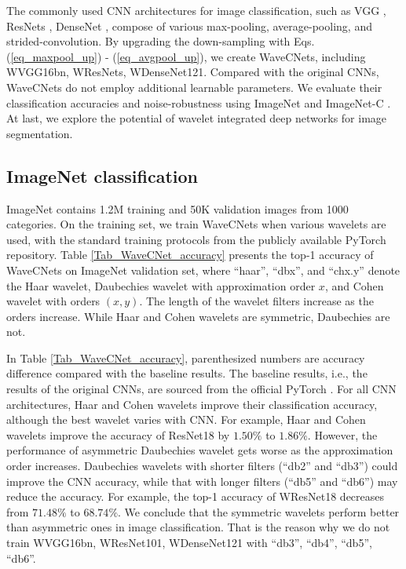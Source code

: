 \documentclass[10pt,twocolumn,letterpaper]{article}
\begin{document}
The commonly used CNN architectures for image classification,
such as VGG \cite{simonyan2014very}, ResNets \cite{he2016deep}, DenseNet \cite{huang2017densely},
compose of various max-pooling, average-pooling, and strided-convolution.
By upgrading the down-sampling with Eqs. (\ref{eq_maxpool_up}) - (\ref{eq_avgpool_up}),
we create WaveCNets, including WVGG16bn, WResNets, WDenseNet121.
Compared with the original CNNs, WaveCNets do not employ additional learnable parameters.
We evaluate their classification accuracies and noise-robustness
using ImageNet \cite{deng2009imagenet} and ImageNet-C \cite{hendrycks2019benchmarking}.
At last, we explore the potential of wavelet integrated deep networks for image segmentation.

\subsection{ImageNet classification}
ImageNet contains 1.2M training and 50K validation images from 1000 categories.
On the training set,
we train WaveCNets when various wavelets are used,
with the standard training protocols from the publicly available PyTorch \cite{paszke2017automatic} repository.
Table \ref{Tab_WaveCNet_accuracy} presents the top-1 accuracy of WaveCNets on ImageNet validation set,
where ``haar'', ``dbx'', and ``chx.y'' denote the Haar wavelet, Daubechies wavelet with approximation order $x$,
and Cohen wavelet with orders $(x,y)$.
The length of the wavelet filters increase as the orders increase.
While Haar and Cohen wavelets are symmetric, Daubechies are not.

In Table \ref{Tab_WaveCNet_accuracy}, parenthesized numbers are accuracy difference compared with the baseline results.
The baseline results, i.e., the results of the original CNNs, are sourced from the official PyTorch \cite{paszke2017automatic}.
For all CNN architectures, Haar and Cohen wavelets improve their classification accuracy,
although the best wavelet varies with CNN.
For example, Haar and Cohen wavelets improve the accuracy of ResNet18 by $1.50\%$ to $1.86\%$.
However, the performance of asymmetric Daubechies wavelet gets worse as the approximation order increases.
Daubechies wavelets with shorter filters (``db2'' and ``db3'') could improve the CNN accuracy,
while that with longer filters (``db5'' and ``db6'') may reduce the accuracy.
For example, the top-1 accuracy of WResNet18 decreases from $71.48\%$ to $68.74\%$.
We conclude that the symmetric wavelets perform better than asymmetric ones in image classification.
That is the reason why we do not train WVGG16bn, WResNet101, WDenseNet121 with ``db3'', ``db4'', ``db5'', ``db6''.
\end{document}
